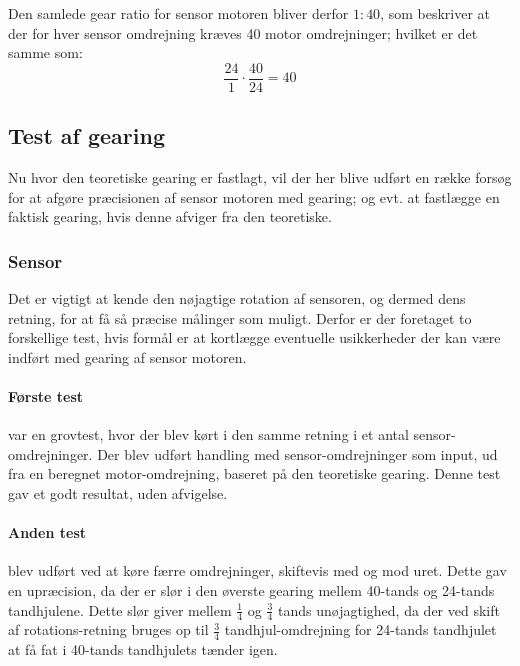 Den samlede gear ratio for sensor motoren bliver derfor $1:40$, som beskriver at der for hver sensor omdrejning kræves 40 motor omdrejninger; hvilket er det samme som:
$$\frac{24}{1} \cdot \frac{40}{24} = 40$$

\subsection{Test af gearing}\label{robot:gearing-test}
Nu hvor den teoretiske gearing er fastlagt, vil der her blive udført en række forsøg for at afgøre præcisionen af sensor motoren med gearing; og evt. at fastlægge en faktisk gearing, hvis denne afviger fra den teoretiske.

\subsubsection{Sensor}
Det er vigtigt at kende den nøjagtige rotation af sensoren, og dermed dens retning, for at få så præcise målinger som muligt.
Derfor er der foretaget to forskellige test, hvis formål er at kortlægge eventuelle usikkerheder der kan være indført med gearing af sensor motoren.

\paragraph{Første test} var en grovtest, hvor der blev kørt i den samme retning i et antal sensor-omdrejninger.
Der blev udført handling med sensor-omdrejninger som input, ud fra en beregnet motor-omdrejning, baseret på den teoretiske gearing.
Denne test gav et godt resultat, uden afvigelse.

\paragraph{Anden test} blev udført ved at køre færre omdrejninger, skiftevis med og mod uret.
Dette gav en upræcision, da der er slør i den øverste gearing mellem 40-tands og 24-tands tandhjulene.
Dette slør giver mellem $\frac{1}{4}$ og $\frac{3}{4}$ tands unøjagtighed, da der ved skift af rotations-retning bruges op til $\frac{3}{4}$ tandhjul-omdrejning for 24-tands tandhjulet at få fat i 40-tands tandhjulets tænder igen.